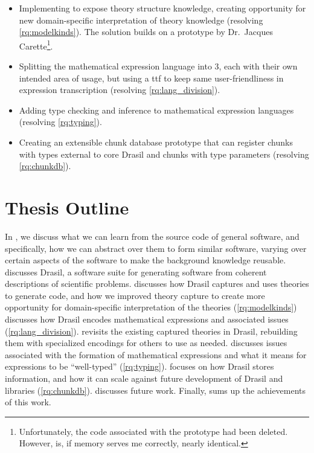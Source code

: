 \begin{itemize}

      \item Implementing \ModelKinds{} to expose theory structure knowledge,
            creating opportunity for new domain-specific interpretation of
            theory knowledge (resolving \ref{rq:modelkinds}). The solution
            builds on a prototype by Dr.\ Jacques Carette\footnote{Unfortunately,
                  the code associated with the prototype had been deleted. However,
                   is, if memory serves me
                  correctly, nearly identical.}.

      \item Splitting the mathematical expression language into 3, each with
            their own intended area of usage, but using a \acs{ttf}
            \cite{Carette2009} to keep same user-friendliness in expression
            transcription (resolving \ref{rq:lang_division}).

      \item Adding type checking and inference to mathematical expression
            languages (resolving \ref{rq:typing}).

      \item Creating an extensible chunk database prototype that can register
            chunks with types external to core Drasil and chunks with type
            parameters (resolving \ref{rq:chunkdb}).

\end{itemize}

\section{Thesis Outline}
\label{chap:intro:sec:thesis-outline}

In , we discuss what we can learn from the source code of
general software, and specifically, how we can abstract over them to form
similar software, varying over certain aspects of the software to make the
background knowledge reusable.  discusses Drasil, a software
suite for generating software from coherent descriptions of scientific problems.
 discusses how Drasil captures and uses theories to
generate code, and how we improved theory capture to create more opportunity for
domain-specific interpretation of the theories (\ref{rq:modelkinds})
 discusses how Drasil encodes mathematical expressions
and associated issues (\ref{rq:lang_division}). 
revisits the existing captured theories in Drasil, rebuilding them with
specialized encodings for others to use as needed. 
discusses issues associated with the formation of mathematical expressions and
what it means for expressions to be ``well-typed'' (\ref{rq:typing}).
 focuses on how Drasil stores information, and how it
can scale against future development of Drasil and libraries (\ref{rq:chunkdb}).
 discusses future work. Finally, 
sums up the achievements of this work.
